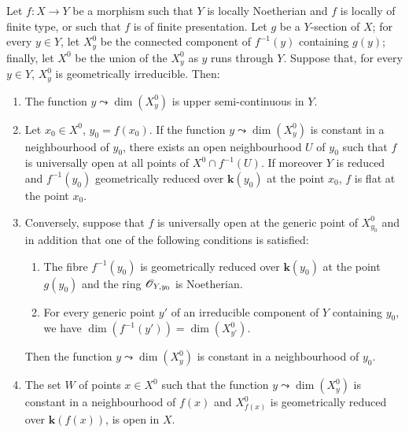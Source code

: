 \begin{proposition}[15.6.6]
\label{IV.15.6.6}
Let $f:X\to Y$ be a morphism such that $Y$ is locally Noetherian and $f$ is locally of finite type, \textup{or} such that $f$ is of finite presentation.
Let $g$ be a $Y$-section of $X$; for every $y\in Y$, let $X_y^0$ be the connected component of $f^{-1}(y)$ containing $g(y)$; finally, let $X^0$ be the union of the $X_y^0$ as $y$ runs through $Y$.
Suppose that, for every $y\in Y$, $X_y^0$ is geometrically irreducible.
Then:
\begin{enumerate}[label=(\roman*)]
  \item The function $y\leadsto\dim(X_y^0)$ is upper semi-continuous in $Y$.
  \item Let $x_0\in X^0$, $y_0=f(x_0)$.
If the function $y\leadsto\dim(X_y^0)$ is constant in a neighbourhood of $y_0$, there exists an open neighbourhood $U$ of $y_0$ such that $f$ is universally open at all points of $X^0\cap f^{-1}(U)$.
If moreover $Y$ is reduced and $f^{-1}(y_0)$ geometrically reduced over $\boldsymbol{k}(y_0)$ at the point $x_0$, $f$ is flat at the point $x_0$.
  \item Conversely, suppose that $f$ is universally open at the generic point of $X_{y_0}^0$ and in addition that \textup{one} of the following conditions is satisfied:
  \begin{enumerate}
    \item[$\alpha$)] The fibre $f^{-1}(y_0)$ is geometrically reduced over $\boldsymbol{k}(y_0)$ at the point $g(y_0)$ and the ring $\mathscr{O}_{Y,y_0}$ is Noetherian.
    \item[$\beta$)] For every generic point $y'$ of an irreducible component of $Y$ containing $y_0$, we have $\dim(f^{-1}(y'))=\dim(X_{y'}^0)$.
  \end{enumerate}
Then the function $y\leadsto\dim(X_y^0)$ is constant in a neighbourhood of $y_0$.
  \item The set $W$ of points $x\in X^0$ such that the function $y\leadsto\dim(X_y^0)$ is constant in a neighbourhood of $f(x)$ and $X_{f(x)}^0$ is geometrically reduced over $\boldsymbol{k}(f(x))$, is open in $X$.
\end{enumerate}
\end{proposition}

